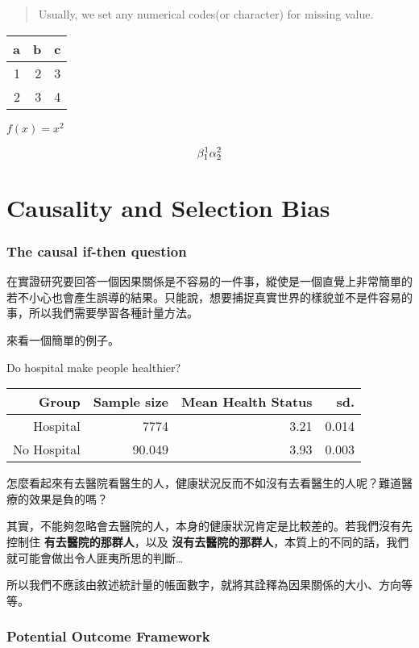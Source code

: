 \documentclass[]{book}
\begin{document}
\begin{quote}
Usually, we set any numerical codes(or character) for missing value.
\end{quote}

\begin{longtable}[]{@{}rrr@{}}
\toprule
a & b & c\tabularnewline
\midrule
\endhead
1 & 2 & 3\tabularnewline
2 & 3 & 4\tabularnewline
\bottomrule
\end{longtable}

\(f(x) = x^2\)

\[
\beta^1_1\\
\alpha^2_2\\
\]

\hypertarget{causality-and-selection-bias}{%
\chapter{Causality and Selection Bias}\label{causality-and-selection-bias}}

\hypertarget{the-causal-if-then-question}{%
\subsection{The causal if-then question}\label{the-causal-if-then-question}}

在實證研究要回答一個因果關係是不容易的一件事，縱使是一個直覺上非常簡單的若不小心也會產生誤導的結果。只能說，想要捕捉真實世界的樣貌並不是件容易的事，所以我們需要學習各種計量方法。

來看一個簡單的例子。

Do hospital make people healthier?

\begin{longtable}[]{@{}rrrr@{}}
\toprule
Group & Sample size & Mean Health Status & sd.\tabularnewline
\midrule
\endhead
Hospital & 7774 & 3.21 & 0.014\tabularnewline
No Hospital & 90.049 & 3.93 & 0.003\tabularnewline
\bottomrule
\end{longtable}

怎麼看起來有去醫院看醫生的人，健康狀況反而不如沒有去看醫生的人呢？難道醫療的效果是負的嗎？

其實，不能夠忽略會去醫院的人，本身的健康狀況肯定是比較差的。若我們沒有先控制住 \textbf{有去醫院的那群人}，以及 \textbf{沒有去醫院的那群人}，本質上的不同的話，我們就可能會做出令人匪夷所思的判斷\ldots{}

所以我們不應該由敘述統計量的帳面數字，就將其詮釋為因果關係的大小、方向等等。

\hypertarget{potential-outcome-framework}{%
\subsection{Potential Outcome Framework}\label{potential-outcome-framework}}
\end{document}
